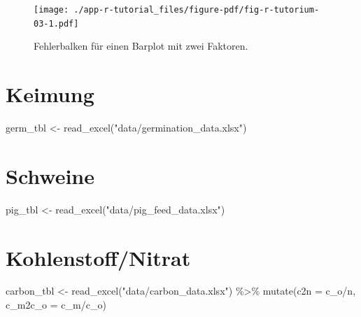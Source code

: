 \documentclass[
  letterpaper,
]{scrbook}
\newenvironment{Shaded}{\begin{snugshade}}{\end{snugshade}}
\newcommand{\AttributeTok}[1]{\textcolor[rgb]{0.40,0.45,0.13}{#1}}
\newcommand{\FunctionTok}[1]{\textcolor[rgb]{0.28,0.35,0.67}{#1}}
\newcommand{\NormalTok}[1]{\textcolor[rgb]{0.00,0.23,0.31}{#1}}
\newcommand{\OtherTok}[1]{\textcolor[rgb]{0.00,0.23,0.31}{#1}}
\newcommand{\SpecialCharTok}[1]{\textcolor[rgb]{0.37,0.37,0.37}{#1}}
\newcommand{\StringTok}[1]{\textcolor[rgb]{0.13,0.47,0.30}{#1}}
\begin{document}
\begin{figure}[H]

{\centering \texttt{[image: ./app-r-tutorial\_files/figure-pdf/fig-r-tutorium-03-1.pdf]}

}

\caption{\label{fig-r-tutorium-03}Fehlerbalken für einen Barplot mit
zwei Faktoren.}

\end{figure}

\hypertarget{keimung}{%
\section{Keimung}\label{keimung}}

\begin{Shaded}
\begin{Highlighting}[]
\NormalTok{germ\_tbl }\OtherTok{\textless{}{-}} \FunctionTok{read\_excel}\NormalTok{(}\StringTok{"data/germination\_data.xlsx"}\NormalTok{)}
\end{Highlighting}
\end{Shaded}

\hypertarget{schweine}{%
\section{Schweine}\label{schweine}}

\begin{Shaded}
\begin{Highlighting}[]
\NormalTok{pig\_tbl }\OtherTok{\textless{}{-}} \FunctionTok{read\_excel}\NormalTok{(}\StringTok{"data/pig\_feed\_data.xlsx"}\NormalTok{)}
\end{Highlighting}
\end{Shaded}

\hypertarget{kohlenstoffnitrat}{%
\section{Kohlenstoff/Nitrat}\label{kohlenstoffnitrat}}

\begin{Shaded}
\begin{Highlighting}[]
\NormalTok{carbon\_tbl }\OtherTok{\textless{}{-}} \FunctionTok{read\_excel}\NormalTok{(}\StringTok{"data/carbon\_data.xlsx"}\NormalTok{) }\SpecialCharTok{\%\textgreater{}\%} 
  \FunctionTok{mutate}\NormalTok{(}\AttributeTok{c2n =}\NormalTok{ c\_o}\SpecialCharTok{/}\NormalTok{n,}
         \AttributeTok{c\_m2c\_o =}\NormalTok{ c\_m}\SpecialCharTok{/}\NormalTok{c\_o)}
\end{Highlighting}
\end{Shaded}
\end{document}
